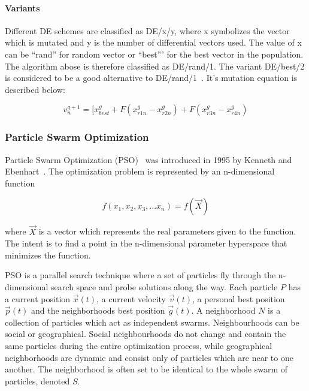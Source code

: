 \paragraph{Variants}

Different DE schemes are classified as DE/x/y, where x symbolizes the vector which is mutated and y is the number of differential vectors used. The value of x can be ``rand'' for random vector or ``best''' for the best vector in the population. The algorithm abose is therefore classified as DE/rand/1. The variant DE/best/2 is considered to be a good alternative to DE/rand/1~\cite{qin2009differential}. It's mutation equation is described below:

\begin{equation}
v_{n}^{g+1} = [ x_{best}^{g} + F(x_{r1n}^{g} - x_{r2n}^{g}) + F(x_{r3n}^{g} - x_{r4n}^{g})
\end{equation}

\subsubsection{Particle Swarm Optimization}

Particle Swarm Optimization (PSO)~\cite{Das2008} was introduced in 1995 by Kenneth and Ebenhart~\cite{eberhart1995new}. The optimization problem is represented by an n-dimensional function

\begin{equation}
  f(x_1,x_2,x_3,...x_n) = f(\vec{X})
\end{equation}

where $\vec{X}$ is a vector which represents the real parameters given to the function. The intent is to find a point in the n-dimensional parameter hyperspace that minimizes the function.

PSO is a parallel search technique where a set of particles  fly through the n-dimensional search space and probe solutions along the way. Each particle $P$ has a current position $\vec{x}(t)$, a current velocity $\vec{v}(t)$, a personal best position $\vec{p}(t)$ and the neighborhoods best position $\vec{g}(t)$. A neighborhood $N$ is a collection of particles which act as independent swarms. Neighbourhoods can be social or geographical. Social neighbourhoods do not change and contain the same particles during the entire optimization process, while geographical neighborhoods are dynamic and consist only of particles which are near to one another. The neighborhood is often set to be identical to the whole swarm of particles, denoted $S$.

